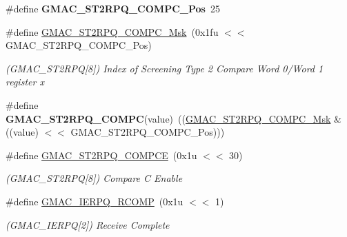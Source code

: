 \begin{DoxyCompactItemize}
\mbox{\label{group__SAME70__GMAC_ga7cfc1e76f581aa54fa852b1c857ac826}} 
\#define {\bfseries G\+M\+A\+C\+\_\+\+S\+T2\+R\+P\+Q\+\_\+\+C\+O\+M\+P\+C\+\_\+\+Pos}~25
\item 
\mbox{\label{group__SAME70__GMAC_ga4aa7a5ec392635ce0ceb4c7d8f26f438}} 
\#define \mbox{\hyperlink{group__SAME70__GMAC_ga4aa7a5ec392635ce0ceb4c7d8f26f438}{G\+M\+A\+C\+\_\+\+S\+T2\+R\+P\+Q\+\_\+\+C\+O\+M\+P\+C\+\_\+\+Msk}}~(0x1fu $<$$<$ G\+M\+A\+C\+\_\+\+S\+T2\+R\+P\+Q\+\_\+\+C\+O\+M\+P\+C\+\_\+\+Pos)
\begin{DoxyCompactList}\small\item\em (G\+M\+A\+C\+\_\+\+S\+T2\+R\+PQ\mbox{[}8\mbox{]}) Index of Screening Type 2 Compare Word 0/\+Word 1 register x \end{DoxyCompactList}\item 
\mbox{\label{group__SAME70__GMAC_ga690b4afd58e9e79392e2272f298c348e}} 
\#define {\bfseries G\+M\+A\+C\+\_\+\+S\+T2\+R\+P\+Q\+\_\+\+C\+O\+M\+PC}(value)~((\mbox{\hyperlink{group__SAMV71__GMAC_ga4aa7a5ec392635ce0ceb4c7d8f26f438}{G\+M\+A\+C\+\_\+\+S\+T2\+R\+P\+Q\+\_\+\+C\+O\+M\+P\+C\+\_\+\+Msk}} \& ((value) $<$$<$ G\+M\+A\+C\+\_\+\+S\+T2\+R\+P\+Q\+\_\+\+C\+O\+M\+P\+C\+\_\+\+Pos)))
\item 
\mbox{\label{group__SAME70__GMAC_ga3dcf70ea0afd1c9ce9c659fa9af611d0}} 
\#define \mbox{\hyperlink{group__SAME70__GMAC_ga3dcf70ea0afd1c9ce9c659fa9af611d0}{G\+M\+A\+C\+\_\+\+S\+T2\+R\+P\+Q\+\_\+\+C\+O\+M\+P\+CE}}~(0x1u $<$$<$ 30)
\begin{DoxyCompactList}\small\item\em (G\+M\+A\+C\+\_\+\+S\+T2\+R\+PQ\mbox{[}8\mbox{]}) Compare C Enable \end{DoxyCompactList}\item 
\mbox{\label{group__SAME70__GMAC_ga7f1b7855a84c42a942e2f3d986a9d65a}} 
\#define \mbox{\hyperlink{group__SAME70__GMAC_ga7f1b7855a84c42a942e2f3d986a9d65a}{G\+M\+A\+C\+\_\+\+I\+E\+R\+P\+Q\+\_\+\+R\+C\+O\+MP}}~(0x1u $<$$<$ 1)
\begin{DoxyCompactList}\small\item\em (G\+M\+A\+C\+\_\+\+I\+E\+R\+PQ\mbox{[}2\mbox{]}) Receive Complete \end{DoxyCompactList}\item 

\end{DoxyCompactItemize}
